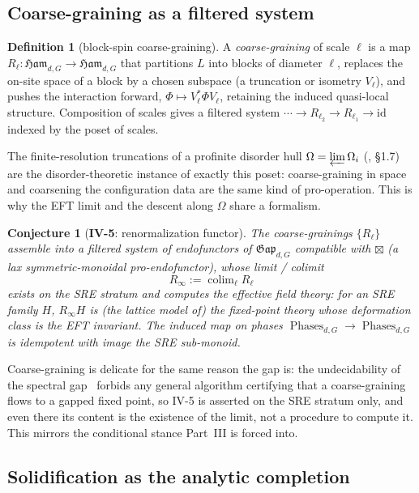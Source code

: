 \documentclass[12pt]{article}
\newcommand{\Ham}{\mathfrak{Ham}}              %
\newcommand{\Gap}{\mathfrak{Gap}}              %
\newcommand{\Phases}{\operatorname{Phases}}    %
\newcommand{\dis}{\Omega}                       %
\DeclareMathOperator{\colim}{colim}
\theoremstyle{definition}
\newtheorem{definition}[definition]{Definition}
\theoremstyle{remark}
\theoremstyle{plain}
\newtheorem*{conjecture}{Conjecture}
\begin{document}
\subsection{Coarse-graining as a filtered system}

\begin{definition}[block-spin coarse-graining]
\label{def:coarse}
A \emph{coarse-graining} of scale $\ell$ is a map
$R_\ell:\Ham_{d,G}\to\Ham_{d,G}$ that partitions $L$ into blocks of diameter
$\ell$, replaces the on-site space of a block by a chosen subspace (a truncation
or isometry $V_\ell$), and pushes the interaction forward, $\Phi\mapsto
V_\ell^\ast\Phi V_\ell$, retaining the induced quasi-local structure. Composition
of scales gives a filtered system
$\cdots\to R_{\ell_2}\to R_{\ell_1}\to\mathrm{id}$ indexed by the poset of
scales.
\end{definition}

The finite-resolution truncations of a profinite disorder hull
$\dis=\varprojlim\dis_i$ (\cite{paperPositivity}, \S1.7) are the disorder-theoretic
instance of exactly this poset: coarse-graining in space and coarsening the
configuration data are the same kind of pro-operation. This is why the EFT limit
and the descent along $\dis$ share a formalism.

\begin{conjecture}[\textbf{IV-5}: renormalization functor]
\label{conj:iv5}
The coarse-grainings $\{R_\ell\}$ assemble into a filtered system of endofunctors
of $\Gap_{d,G}$ compatible with $\boxtimes$ (a lax symmetric-monoidal
pro-endofunctor), whose limit / colimit
\[
  R_\infty:=\colim_\ell R_\ell
\]
exists on the SRE stratum and computes the effective field theory: for an SRE
family $H$, $R_\infty H$ is (the lattice model of) the fixed-point theory whose
deformation class is the EFT invariant. The induced map on phases
$\Phases_{d,G}\to\Phases_{d,G}$ is idempotent with image the SRE sub-monoid.
\end{conjecture}

Coarse-graining is delicate for the same reason the gap is: the undecidability of
the spectral gap~\cite{cpw-undecidable} forbids any general algorithm certifying
that a coarse-graining flows to a gapped fixed point, so IV-5 is asserted on the
SRE stratum only, and even there its content is the existence of the limit, not a
procedure to compute it. This mirrors the conditional stance Part~III is forced
into.

\subsection{Solidification as the analytic completion}
\end{document}
